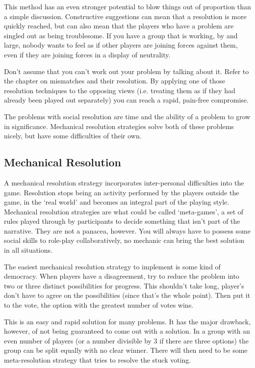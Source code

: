 \documentclass[twoside]{book}
\begin{document}
This method has an even stronger potential to blow things out of
proportion than a simple discussion. Constructive suggestions can mean
that a resolution is more quickly reached, but can also mean that the
players who have a problem are singled out as being troublesome. If
you have a group that is working, by and large, nobody wants to feel
as if other players are joining forces against them, even if they are
joining forces in a display of neutrality.

Don't assume that you can't work out your problem by talking about
it. Refer to the chapter on mismatches and their resolution. By
applying one of those resolution techniques to the opposing views
(i.e. treating them as if they had already been played out separately)
you can reach a rapid, pain-free compromise.

The problems with social resolution are time and the ability of a
problem to grow in significance. Mechanical resolution strategies
solve both of these problems nicely, but have some difficulties of
their own.

\subsection{Mechanical Resolution}

A mechanical resolution strategy incorporates inter-personal
difficulties into the game. Resolution stops being an activity
performed by the players outside the game, in the `real world' and
becomes an integral part of the playing style. Mechanical resolution
strategies are what could be called `meta-games', a set of rules
played through by participants to decide something that isn't part of
the narrative. They are not a panacea, however. You will always have
to possess some social skills to role-play collaboratively, no
mechanic can bring the best solution in all situations.

The easiest mechanical resolution strategy to implement is some kind
of democracy. When players have a disagreement, try to reduce the
problem into two or three distinct possibilities for progress. This
shouldn't take long, player's don't have to agree on the possibilities
(since that's the whole point). Then put it to the vote, the option
with the greatest number of votes wins.

This is an easy and rapid solution for many problems. It has the major
drawback, however, of not being guaranteed to come out with a
solution. In a group with an even number of players (or a number
divisible by 3 if there are three options) the group can be split
equally with no clear winner. There will then need to be some
meta-resolution strategy that tries to resolve the stuck voting.
\end{document}
